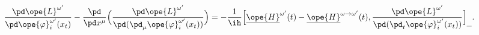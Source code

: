 \begin{equation}	\label{12.94}
\frac{\pd\ope{L}^{\omega'}}{\pd \ope{\varphi}_i^{\omega'}(x_t)}
-
\frac{\pd}{\pd x^\mu}\Bigl(
	\frac{\pd\ope{L}^{\omega'}}{\pd(\pd_\mu\ope{\varphi}_i^{\omega'}(x_t) )}
	 \Bigr)
=
- \frac{1}{\ih}
\Bigl[
\underline{\ope{H}}^{\omega'}(t) - \underline{\ope{H}}^{\omega\to\omega'}(t)
,
\frac{\pd\ope{L}^{\omega'}} {\pd(\pd_t\ope{\varphi}_i^{\omega'}(x_t) )}
\Bigr]_{\_} .
	\end{equation}

